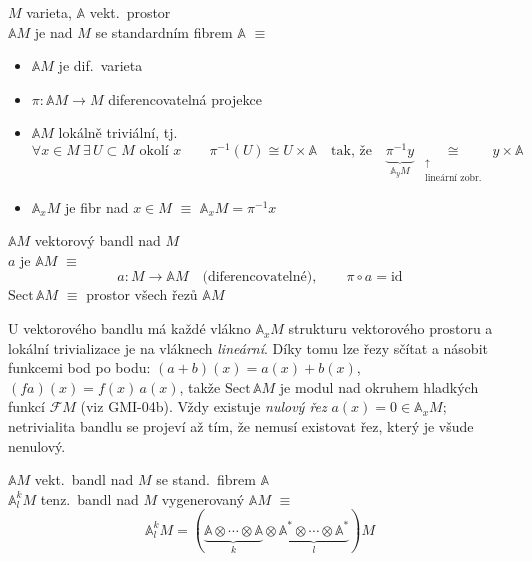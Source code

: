 \begin{definice}
$M$ varieta, $\mathbb{A}$ vekt.\ prostor \\
$\mathbb{A}M$ je  nad $M$ se standardním fibrem $\mathbb{A}$ $\equiv$
\begin{itemize}[nosep]
  \item[] $\mathbb{A}M$ je dif.\ varieta
  \item[] $\pi:\mathbb{A}M\to M$ \quad diferencovatelná projekce
  \item[] $\mathbb{A}M$ lokálně triviální, tj.
  \[
    \forall x\in M\ \exists\, U\subset M \text{ okolí } x \qquad
    \pi^{-1}(U)\cong U\times\mathbb{A} \quad\text{tak, že}\quad
    \underbrace{\pi^{-1}y}_{\mathbb{A}_yM}\ \underset{\substack{\uparrow\\ \text{lineární zobr.}}}{\cong}\ y\times\mathbb{A}
  \]
  \item[] $\mathbb{A}_xM$ je fibr nad $x\in M$ \quad $\equiv$ \quad $\mathbb{A}_xM = \pi^{-1}x$
\end{itemize}
\end{definice}

\begin{definice}
$\mathbb{A}M$ vektorový bandl nad $M$ \\
$a$ je  $\mathbb{A}M$ $\equiv$
\[
  a: M\to\mathbb{A}M \quad\text{(diferencovatelné)}, \qquad \pi\circ a = \mathrm{id}
\]
$\mathrm{Sect}\,\mathbb{A}M$ $\equiv$ prostor všech řezů $\mathbb{A}M$
\end{definice}

\begin{vysvetleni}
U vektorového bandlu má každé vlákno $\mathbb{A}_xM$ strukturu vektorového prostoru a lokální trivializace je na vláknech \emph{lineární}.
Díky tomu lze řezy sčítat a násobit funkcemi bod po bodu: $(a+b)(x)=a(x)+b(x)$, $(fa)(x)=f(x)\,a(x)$,
takže $\mathrm{Sect}\,\mathbb{A}M$ je modul nad okruhem hladkých funkcí $\mathcal{F}M$ (viz GMI-04b).
Vždy existuje \emph{nulový řez} $a(x)=0\in\mathbb{A}_xM$; netrivialita bandlu se projeví až tím, že nemusí existovat řez, který je všude nenulový.
\end{vysvetleni}

\begin{definice}
$\mathbb{A}M$ vekt.\ bandl nad $M$ se stand.\ fibrem $\mathbb{A}$ \\
$\mathbb{A}^k_lM$ tenz.\ bandl nad $M$ vygenerovaný $\mathbb{A}M$ $\equiv$
\[
  \mathbb{A}^k_lM = (\underbrace{\mathbb{A}\otimes\cdots\otimes\mathbb{A}}_{k}\otimes\underbrace{\mathbb{A}^*\otimes\cdots\otimes\mathbb{A}^*}_{l})M
\]
\end{definice}

